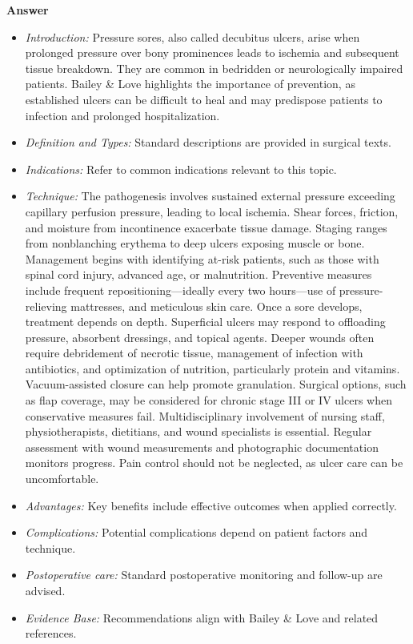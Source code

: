 \documentclass{article}
\begin{document}
\textbf{Answer}
\begin{itemize}

\item \emph{Introduction:} Pressure sores, also called decubitus ulcers, arise when prolonged pressure over bony prominences leads to ischemia and subsequent tissue breakdown. They are common in bedridden or neurologically impaired patients. Bailey \& Love highlights the importance of prevention, as established ulcers can be difficult to heal and may predispose patients to infection and prolonged hospitalization.
\item \emph{Definition and Types:} Standard descriptions are provided in surgical texts.
\item \emph{Indications:} Refer to common indications relevant to this topic.

\item \emph{Technique:} The pathogenesis involves sustained external pressure exceeding capillary perfusion pressure, leading to local ischemia. Shear forces, friction, and moisture from incontinence exacerbate tissue damage. Staging ranges from nonblanching erythema to deep ulcers exposing muscle or bone. Management begins with identifying at-risk patients, such as those with spinal cord injury, advanced age, or malnutrition. Preventive measures include frequent repositioning—ideally every two hours—use of pressure-relieving mattresses, and meticulous skin care. Once a sore develops, treatment depends on depth. Superficial ulcers may respond to offloading pressure, absorbent dressings, and topical agents. Deeper wounds often require debridement of necrotic tissue, management of infection with antibiotics, and optimization of nutrition, particularly protein and vitamins. Vacuum-assisted closure can help promote granulation. Surgical options, such as flap coverage, may be considered for chronic stage III or IV ulcers when conservative measures fail. Multidisciplinary involvement of nursing staff, physiotherapists, dietitians, and wound specialists is essential. Regular assessment with wound measurements and photographic documentation monitors progress. Pain control should not be neglected, as ulcer care can be uncomfortable.
\item \emph{Advantages:} Key benefits include effective outcomes when applied correctly.
\item \emph{Complications:} Potential complications depend on patient factors and technique.
\item \emph{Postoperative care:} Standard postoperative monitoring and follow-up are advised.
\item \emph{Evidence Base:} Recommendations align with Bailey \& Love and related references.


\end{itemize}
\end{document}
